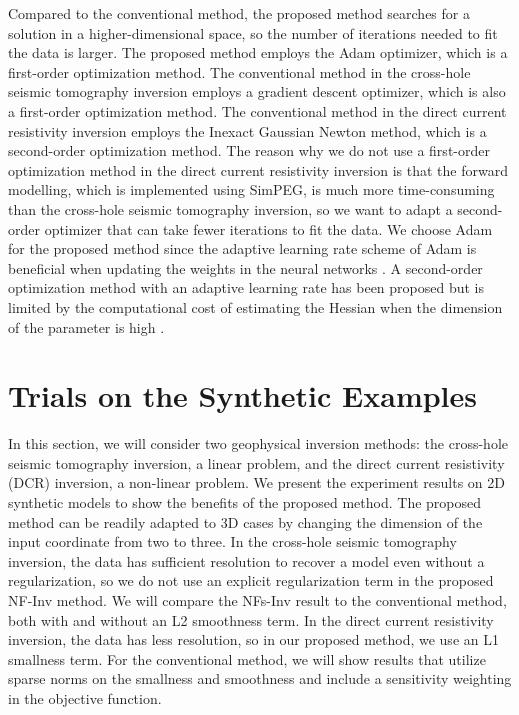 \documentclass[lettersize,journal]{IEEEtran}
\begin{document}
Compared to the conventional method, the proposed method searches for a solution in a higher-dimensional space, so the number of iterations needed to fit the data is larger. The proposed method employs the Adam optimizer, which is a first-order optimization method. The conventional method in the cross-hole seismic tomography inversion employs a gradient descent optimizer, which is also a first-order optimization method. The conventional method in the direct current resistivity inversion employs the Inexact Gaussian Newton method, which is a second-order optimization method. The reason why we do not use a first-order optimization method in the direct current resistivity inversion is that the forward modelling, which is implemented using SimPEG, is much more time-consuming than the cross-hole seismic tomography inversion, so we want to adapt a second-order optimizer that can take fewer iterations to fit the data. We choose Adam for the proposed method since the adaptive learning rate scheme of Adam is beneficial when updating the weights in the neural networks \cite{kingma2017adammethodstochasticoptimization}. A second-order optimization method with an adaptive learning rate has been proposed but is limited by the computational cost of estimating the Hessian when the dimension of the parameter is high \cite{tan_lim_2019}.

\section{Trials on the Synthetic Examples}
\label{sec:3}
In this section, we will consider two geophysical inversion methods: the cross-hole seismic tomography inversion, a linear problem, and the direct current resistivity (DCR) inversion, a non-linear problem. We present the experiment results on 2D synthetic models to show the benefits of the proposed method. The proposed method can be readily adapted to 3D cases by changing the dimension of the input coordinate from two to three. In the cross-hole seismic tomography inversion, the data has sufficient resolution to recover a model even without a regularization, so we do not use an explicit regularization term in the proposed NF-Inv method. We will compare the NFs-Inv result to the conventional method, both with and without an L2 smoothness term. In the direct current resistivity inversion, the data has less resolution, so in our proposed method, we use an L1 smallness term. For the conventional method, we will show results that utilize sparse norms on the smallness and smoothness and include a sensitivity weighting in the objective function.
\end{document}
